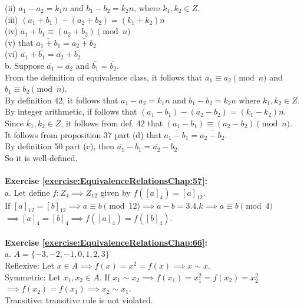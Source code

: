 (ii) $a_1-a_2=k_1n$ and $b_1-b_2=k_2n$, where $k_1,k_2 \in Z$.\\
(iii) $(a_1+b_1)-(a_2+b_2)=(k_1+k_2)n$\\
(iv) $a_1+b_1 \equiv (a_2+b_2)\pmod{n}$\\
(v) that $\overline{a_1+b_1}=\overline{a_2+b_2}$\\
(vi) $\overline{a_1}+\overline{b_1}=\overline{a_2}+\overline{b_2}$\\
b. Suppose $\overline{a_1}=\overline{a_2}$ and $\overline{b_1}=\overline{b_2}$.\\
From the definition of equivalence class, it follows that $a_1\equiv a_2\pmod{n}$ and $b_1\equiv b_2\pmod{n}$.\\
By definition 42, it follows that $a_1-a_2=k_1n$ and $b_1-b_2=k_2n$ where $k_1,k_2 \in Z$.\\
By integer arithmetic, if follows that $(a_1-b_1)-(a_2-b_2)=(k_1-k_2)n$.\\
Since $k_1,k_2 \in Z$, it follows from def. 42 that $(a_1-b_1)\equiv (a_2-b_2)\pmod{n}$.\\
It follows from proposition 37 part (d) that $\overline{a_1-b_1}=\overline{a_2-b_2}$.\\
By definition 50 part (c), then $\overline{a_1}-\overline{b_1}=\overline{a_2}-\overline{b_2}$.\\
So it is well-defined.\\
\\
\textbf{Exercise \ref{exercise:EquivalenceRelationsChap:57}:}\\
a. Let define $f:Z_4\implies Z_{12}$ given by $f([a]_4)=[a]_{12}$.\\
If $[a]_{12}=[b]_{12} \implies a\equiv b\pmod{12} \implies a-b=3.4.k \implies a\equiv b\pmod{4}$\\
$\implies [a]_4=[b]_4 \implies f([a]_4)=f([b]_4)$.\\
\\
\textbf{Exercise \ref{exercise:EquivalenceRelationsChap:66}:}\\
a. $A=\{-3,-2,-1,0,1,2,3\}$\\
Reflexive: Let $x\in A \implies f(x)=x^2=f(x) \implies x\sim x$.\\
Symmetric: Let $x_1,x_2\in A$. If $x_1\sim x_2 \implies f(x_1)=x_1^2=f(x_2)=x_2^2$\\
$\implies f(x_2)=f(x_1) \implies x_2 \sim x_1$.\\
Transitive: transitive rule is not violated.\\
\\
